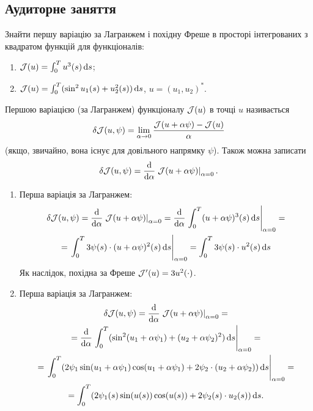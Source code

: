 \subsection{Аудиторне заняття}

\begin{problem}
	Знайти першу варіацію за Лагранжем і похідну Фреше в просторі інтегрованих з квадратом функцій для функціоналів:
	\begin{enumerate}
		\item $\mathcal{J} (u) = \int_0^T u^3(s) \mathop{}\!\mathrm{d} s$;

		\item $\mathcal{J} (u) = \int_0^T (\sin^2 u_1(s) + u_2^2(s)) \mathop{}\!\mathrm{d} s$, $u = (u_1, u_2)^*$.
	\end{enumerate}
\end{problem}

\begin{solution}
	Першою варіацією (за Лагранжем) функціоналу $\mathcal{J}(u)$ в точці $u$ називається \[\delta \mathcal{J}(u, \psi) = \lim\limits_{\alpha \to 0} \frac{\mathcal{J}(u + \alpha \psi) - \mathcal{J}(u)}{\alpha}\] (якщо, звичайно, вона існує для довільного напрямку $\psi$). Також можна записати \[ \delta \mathcal{J}(u, \psi) = \frac{\mathop{}\!\mathrm{d}}{\mathop{}\!\mathrm{d} \alpha} \left.\mathcal{J}(u + \alpha \psi)\right|_{\alpha = 0}. \]

	\begin{enumerate}
		\item Перша варіація за Лагранжем:
		\begin{multline*} 
			\delta \mathcal{J}(u, \psi) = \frac{\mathop{}\!\mathrm{d}}{\mathop{}\!\mathrm{d} \alpha} \left.\mathcal{J}(u + \alpha \psi)\right|_{\alpha = 0} = \frac{\mathop{}\!\mathrm{d}}{\mathop{}\!\mathrm{d} \alpha} \left.\int_0^T(u + \alpha \psi)^3(s) \mathop{}\!\mathrm{d} s\right|_{\alpha = 0} = \\
			= \left.\int_0^T 3 \psi(s) \cdot (u + \alpha \psi)^2(s) \mathop{}\!\mathrm{d} s\right|_{\alpha = 0} = \int_0^T 3 \psi(s) \cdot u^2(s) \mathop{}\!\mathrm{d} s
		\end{multline*} 
		Як наслідок, похідна за Фреше $\mathcal{J}'(u) = 3 u^2(\cdot)$.

		\item Перша варіація за Лагранжем:
		\begin{multline*} 
			\delta \mathcal{J}(u, \psi) = \frac{\mathop{}\!\mathrm{d}}{\mathop{}\!\mathrm{d} \alpha} \left.\mathcal{J}(u + \alpha \psi)\right|_{\alpha = 0} = \\
			= \frac{\mathop{}\!\mathrm{d}}{\mathop{}\!\mathrm{d} \alpha} \left. \int_0^T (\sin^2 (u_1 + \alpha\psi_1) + (u_2 + \alpha \psi_2)^2) \mathop{}\!\mathrm{d} s\right|_{\alpha = 0} = \\
			= \left. \int_0^T (2 \psi_1 \sin(u_1 + \alpha \psi_1)\cos(u_1 + \alpha \psi_1) + 2\psi_2 \cdot (u_2 + \alpha \psi_2)) \mathop{}\!\mathrm{d} s\right|_{\alpha = 0} = \\
			= \int_0^T (2 \psi_1(s) \sin(u(s)) \cos(u(s)) + 2 \psi_2(s) \cdot u_2(s)) \mathop{}\!\mathrm{d} s.
		\end{multline*}
	\end{enumerate} 
\end{solution}

